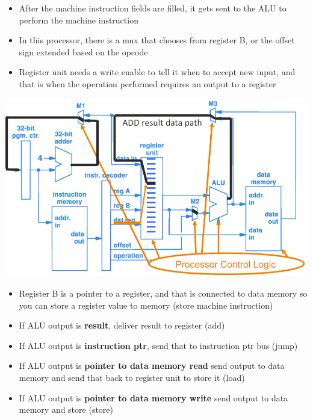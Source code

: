 \documentclass{article}
\begin{document}
 \begin{itemize}
     \item After the machine instruction fields are filled, it gets sent to the ALU to perform the machine instruction
     
     \item In this processor, there is a mux that chooses from register B, or the offset sign extended based on the opcode
     
     \item Register unit needs a write enable to tell it when to accept new input, and that is when the operation performed requires an output to a register 
     

 \end{itemize}
 
 \includegraphics[scale=0.35]{images/6.9 pt 4.png}
 
 \begin{itemize}
 
  \item Register B is a pointer to a register, and that is connected to data memory so you can store a register value to memory (store machine instruction) 
 
      \item If ALU output is \textbf{result},  deliver result to register (add)
    
    \item If ALU output is \textbf{instruction ptr}, send that to instruction ptr bus (jump)
    
    \item If ALU output is \textbf{pointer to data memory read} send output to data memory and send that back to register unit to store it (load)
    
    \item If ALU output is \textbf{pointer to data memory write} send output to data memory and store (store)
 \end{itemize}
 
\end{document}
